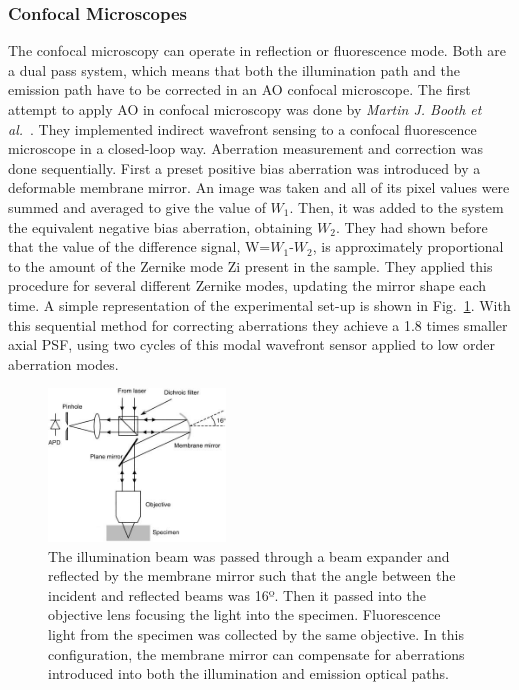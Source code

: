 \subsubsection{Confocal Microscopes}
\label{sec:ConfocalMicroscopes}

The confocal microscopy can operate in reflection or fluorescence mode. Both are a dual pass system, which means that both the illumination path and the emission path have to be corrected in an AO confocal microscope. The first attempt to apply AO in confocal microscopy was done by \textit{Martin J. Booth et al.}~\cite{scan_CFM}. They implemented indirect wavefront sensing to a confocal fluorescence microscope in a closed-loop way. Aberration measurement and correction was done sequentially. First a preset positive bias aberration was introduced by a deformable membrane mirror. An image was taken and all of its pixel values were summed and averaged to give the value of $W_1$. Then, it was added to the system the equivalent negative bias aberration, obtaining $W_2$. They had shown before that the value of the difference signal, W=$W_1$-$W_2$, is approximately proportional to the amount of the Zernike mode Zi present in the sample. They applied this procedure for several different Zernike modes, updating the mirror shape each time. A simple representation of the experimental set-up is shown in Fig.~\ref{fig:AOM_scan_CFM}. With this sequential method for correcting aberrations they achieve a 1.8 times smaller axial PSF, using two cycles of this modal wavefront sensor applied to low order aberration modes.

\begin{figure}[!htbp]
	\centering
		\includegraphics[width=0.42\textwidth,height=0.22\textheight]{images/AOM_scan_CFM.jpg}
		\caption{The illumination beam was passed through a beam expander and reflected by the membrane mirror such that the angle between the incident and reflected beams was 16º. Then it passed into the objective lens focusing the light into the specimen. Fluorescence light from the specimen was collected by the same objective. In this configuration, the membrane mirror can compensate for aberrations introduced into both the illumination and emission optical paths.}
	\label{fig:AOM_scan_CFM}
\end{figure}

